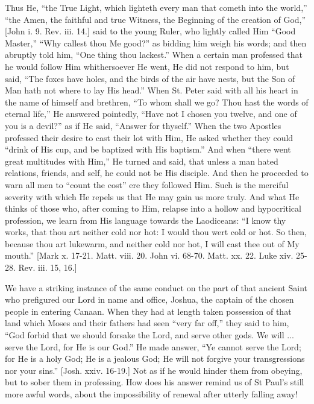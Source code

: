 Thus He, ``the True Light, which lighteth every man that cometh
into the world,'' ``the Amen, the faithful and true Witness,
the Beginning of the creation of God,'' [John i. 9. Rev. iii. 14.]
said to the young Ruler, who lightly called Him ``Good Master,''
``Why callest thou Me good?'' as bidding him weigh his words;
and then abruptly told him, ``One thing thou lackest.'' When a
certain man professed that he would follow Him whithersoever He went,
He did not respond to him, but said, ``The foxes have holes, and
the birds of the air have nests, but the Son of Man hath not where to
lay His head.'' When St. Peter said with all his heart in the name
of himself and brethren, ``To whom shall we go? Thou hast the
words of eternal life,'' He answered pointedly, ``Have not I
chosen you twelve, and one of you is a devil?'' as if He said,
``Answer for thyself.'' When the two Apostles professed their
desire to cast their lot with Him, He asked whether they could
``drink of His cup, and be baptized with His baptism.'' And
when ``there went great multitudes with Him,'' He turned and
said, that unless a man hated relations, friends, and self, he could
not be His disciple. And then he proceeded to warn all men to
``count the cost'' ere they followed Him. Such is the merciful
severity with which He repels us that He may gain us more truly. And
what He thinks of those who, after coming to Him, relapse into a hollow and hypocritical profession, we learn from His language towards
the Laodiceans: ``I know thy works, that thou art neither cold nor
hot: I would thou wert cold or hot. So then, because thou art
lukewarm, and neither cold nor hot, I will cast thee out of My
mouth.'' [Mark x. 17-21. Matt. viii. 20. John vi. 68-70. Matt.
xx. 22. Luke xiv. 25-28. Rev. iii. 15, 16.]

We have a striking instance of the same conduct on the part of that
ancient Saint who prefigured our Lord in name and office, Joshua, the
captain of the chosen people in entering Canaan. When they had at
length taken possession of that land which Moses and their fathers had
seen ``very far off,'' they said to him, ``God forbid
that we should forsake the Lord, and serve other gods. We will ...
serve the Lord, for He is our God.'' He made answer, ``Ye
cannot serve the Lord; for He is a holy God; He is a jealous God; He
will not forgive your transgressions nor your sins.'' [Josh. xxiv.
16-19.] Not as if he would hinder them from obeying, but to sober them
in professing. How does his answer remind us of St Paul's still more
awful words, about the impossibility of renewal after utterly falling
away!

